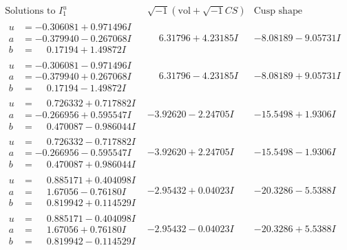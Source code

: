 \documentclass[1p]{elsarticle_modified}
\theoremstyle{definition}
\newcommand{\I}{\sqrt{-1}}
\begin{document}
$$\begin{array}{c|c|c}  
\text{Solutions to }I^u_{1}& \I (\text{vol} + \sqrt{-1}CS) & \text{Cusp shape}\\
 \hline 
\begin{aligned}
u &= -0.306081 + 0.971496 I \\
a &= -0.379940 - 0.267068 I \\
b &= \phantom{-}0.17194 + 1.49872 I\end{aligned}
 & \phantom{-}6.31796 + 4.23185 I & -8.08189 - 9.05731 I \\ \hline\begin{aligned}
u &= -0.306081 - 0.971496 I \\
a &= -0.379940 + 0.267068 I \\
b &= \phantom{-}0.17194 - 1.49872 I\end{aligned}
 & \phantom{-}6.31796 - 4.23185 I & -8.08189 + 9.05731 I \\ \hline\begin{aligned}
u &= \phantom{-}0.726332 + 0.717882 I \\
a &= -0.266956 + 0.595547 I \\
b &= \phantom{-}0.470087 - 0.986044 I\end{aligned}
 & -3.92620 - 2.24705 I & -15.5498 + 1.9306 I \\ \hline\begin{aligned}
u &= \phantom{-}0.726332 - 0.717882 I \\
a &= -0.266956 - 0.595547 I \\
b &= \phantom{-}0.470087 + 0.986044 I\end{aligned}
 & -3.92620 + 2.24705 I & -15.5498 - 1.9306 I \\ \hline\begin{aligned}
u &= \phantom{-}0.885171 + 0.404098 I \\
a &= \phantom{-}1.67056 - 0.76180 I \\
b &= \phantom{-}0.819942 + 0.114529 I\end{aligned}
 & -2.95432 + 0.04023 I & -20.3286 - 5.5388 I \\ \hline\begin{aligned}
u &= \phantom{-}0.885171 - 0.404098 I \\
a &= \phantom{-}1.67056 + 0.76180 I \\
b &= \phantom{-}0.819942 - 0.114529 I\end{aligned}
 & -2.95432 - 0.04023 I & -20.3286 + 5.5388 I \\ \hline\begin{aligned}

\end{aligned}
\end{array}$$
\end{document}
